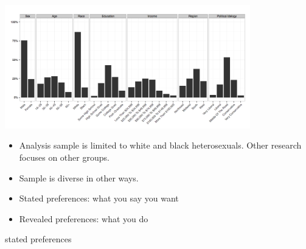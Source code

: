 \documentclass[aspectratio=169]{beamer}
\begin{document}
\begin{frame}

\begin{center}
\includegraphics[width=0.8\textwidth]{figures/anderson_political_2014_fig1}
\end{center}

\pause
\vfill
\begin{itemize}
\item Analysis sample is limited to white and black heterosexuals. \pause Other research focuses on other groups. \pause
\item Sample is diverse in other ways.
\end{itemize}

\end{frame}
\begin{frame}

\begin{itemize}
\item Stated preferences: what you say you want
\item Revealed preferences: what you do
\end{itemize}

\end{frame}
\begin{frame}

\begin{center}
stated preferences
\end{center}

\end{frame}
\end{document}

